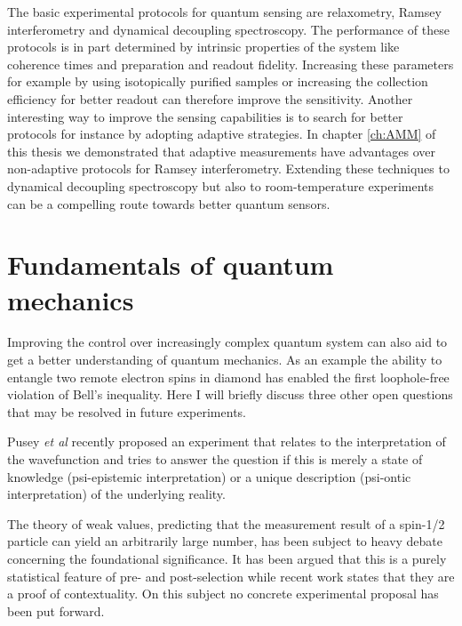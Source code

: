 The basic experimental protocols for quantum sensing are relaxometry, Ramsey interferometry and dynamical decoupling spectroscopy. The performance of these protocols is in part determined by intrinsic properties of the system like coherence times and preparation and readout fidelity. Increasing these parameters for example by using isotopically purified samples or increasing the collection efficiency for better readout can therefore improve the sensitivity. Another interesting way to improve the sensing capabilities is to search for better protocols for instance by adopting adaptive strategies. In chapter \ref{ch:AMM} of this thesis we demonstrated that adaptive measurements have advantages over non-adaptive protocols for Ramsey interferometry. Extending these techniques to dynamical decoupling spectroscopy but also to room-temperature experiments can be a compelling route towards better quantum sensors.

\section{Fundamentals of quantum mechanics}

Improving the control over increasingly complex quantum system can also aid to get a better understanding of quantum mechanics. As an example the ability to entangle two remote electron spins in diamond has enabled the first loophole-free violation of Bell's inequality\cite{Hensen_arXiv_2015}. Here I will briefly discuss three other open questions that may be resolved in future experiments.

Pusey \textit{et al}\cite{Pusey_NatPhys_2012} recently proposed an experiment that relates to the interpretation of the wavefunction and tries to answer the question if this is merely a state of knowledge (psi-epistemic interpretation) or a unique description (psi-ontic interpretation) of the underlying reality. 

The theory of weak values, predicting that the measurement result of a spin-1/2 particle can yield an arbitrarily large number, has been subject to heavy debate concerning the foundational significance. It has been argued that this is a purely statistical feature of pre- and post-selection\cite{Ferrie_Phys.Rev.Lett._2014} while recent work states that they are a proof of contextuality\cite{Pusey_Phys.Rev.Lett._2014}. On this subject no concrete experimental proposal has been put forward.

